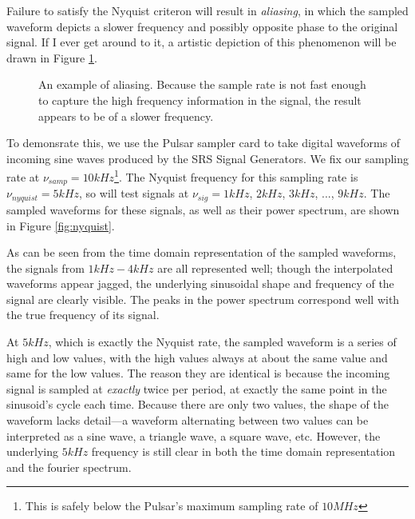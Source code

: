 \documentclass[12pt]{article}
\begin{document}
Failure to satisfy the Nyquist criteron will result in \textit{aliasing}, in which the sampled waveform depicts a slower frequency and possibly opposite phase to the original signal. If I ever get around to it, a artistic depiction of this phenomenon will be drawn in Figure \ref{fig:aliasing}.
\begin{figure}[H]
\caption[SODUMB]{An example of aliasing. Because the sample rate is not fast enough to capture the high frequency information in the signal, the result appears to be of a slower frequency.}
\label{fig:aliasing}
\end{figure}

To demonsrate this, we use the Pulsar sampler card to take digital waveforms of incoming sine waves produced by the SRS Signal Generators. We fix our sampling rate at $\nu_{samp} = 10kHz$\footnote{This is safely below the Pulsar's maximum sampling rate of $10 MHz$}. The Nyquist frequency for this sampling rate is $\nu_{nyquist} = 5 kHz$, so will test signals at $\nu_{sig} = 1kHz$, $2kHz$, $3kHz$, $...$, $9kHz$. The sampled waveforms for these signals, as well as their power spectrum, are shown in Figure \ref{fig:nyquist}.

As can be seen from the time domain representation of the sampled waveforms, the signals from $1kHz-4kHz$ are all represented well; though the interpolated waveforms appear jagged, the underlying sinusoidal shape and frequency of the signal are clearly visible. The peaks in the power spectrum correspond well with the true frequency of its signal.

At $5 kHz$, which is exactly the Nyquist rate, the sampled waveform is a series of high and low values, with the high values always at about the same value and same for the low values. The reason they are identical is because the incoming signal is sampled at \textit{exactly} twice per period, at exactly the same point in the sinusoid's cycle each time. Because there are only two values, the shape of the waveform lacks detail---a waveform alternating between two values can be interpreted as a sine wave, a triangle wave, a square wave, etc. However, the underlying $5 kHz$ frequency is still clear in both the time domain representation and the fourier spectrum. 
\end{document}
